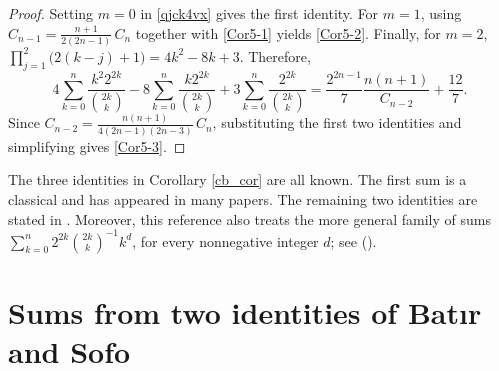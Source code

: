 \documentclass[12pt,reqno]{article}
\begin{document}
\begin{proof}
Setting $m=0$ in \eqref{qjck4vx} gives the first identity. For $m=1$, using $C_{n-1}=\frac{n+1}{2(2n-1)}\,C_n$ together with \eqref{Cor5-1} yields \eqref{Cor5-2}. Finally, for $m=2$, $\prod_{j=1}^{2}\bigl(2(k-j)+1\bigr)=4k^2-8k+3.$ Therefore,
$$4\sum_{k=0}^n \frac{k^2 2^{2k}}{\binom{2k}{k}} - 8\sum_{k=0}^n \frac{k2^{2k}}{\binom{2k}{k}} + 3\sum_{k=0}^n\frac{2^{2k}}{\binom{2k}{k}}
= \frac{2^{2n-1}}{7}\frac{n(n+1)}{C_{n-2}} + \frac{12}{7}.$$
Since $C_{n-2}=\frac{n(n+1)}{4(2n-1)(2n-3)}\,C_n$, substituting the first two identities and simplifying gives \eqref{Cor5-3}.
\end{proof}
\begin{remark}
The three identities in Corollary \ref{cb_cor} are all known. The first sum is a classical and has appeared in many papers. 
The remaining two identities are stated in \cite[Corollary 3.2]{Bataille}. Moreover, this reference also treats the more general family of sums
$\sum\limits_{k = 0}^n {2^{2k}}{\binom{2k}{k}}^{-1} k^d$,
for every nonnegative integer $d$; see (\cite[Theorem 3.1]{Bataille}). 
\end{remark}


\section{Sums from two identities of Bat\i r and Sofo}
\end{document}
